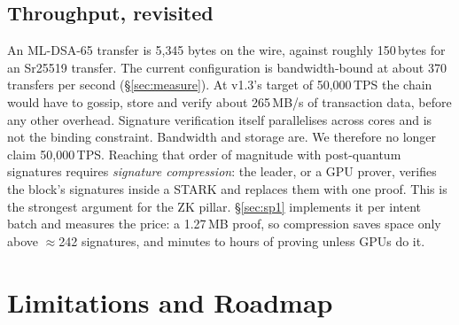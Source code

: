 \documentclass[11pt]{article}
\theoremstyle{definition}
\theoremstyle{remark}
\begin{document}


\subsection{Throughput, revisited}
An ML-DSA-65 transfer is 5{,}345 bytes on the wire, against roughly 150\,bytes for an Sr25519
transfer. The current configuration is bandwidth-bound at about 370 transfers per second
(\S\ref{sec:measure}). At v1.3's target of 50{,}000\,TPS the chain would have to gossip, store and
verify about 265\,MB/s of transaction data, before any other overhead. Signature verification itself parallelises across
cores and is not the binding constraint. Bandwidth and storage are. We therefore no longer claim
50{,}000\,TPS. Reaching that order of magnitude with post-quantum signatures requires
\emph{signature compression}: the leader, or a GPU prover, verifies the block's signatures inside a
STARK and replaces them with one proof. This is the strongest argument for the ZK pillar.
\S\ref{sec:sp1} implements it per intent batch and measures the price: a 1.27\,MB proof, so
compression saves space only above $\approx$242 signatures, and minutes to hours of proving
unless GPUs do it.

\section{Limitations and Roadmap}
\label{sec:limits}
\end{document}
